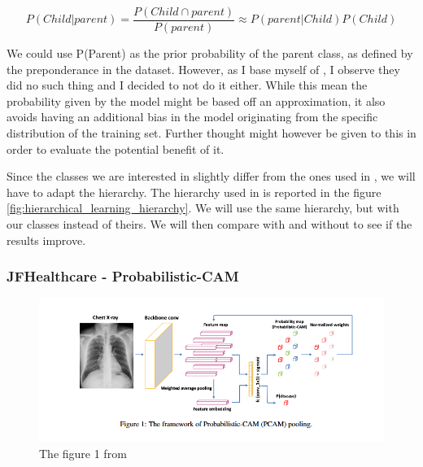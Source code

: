 \documentclass[11pt]{article}
\begin{document}
                    \begin{equation}
                        P(Child|parent) = \frac{P(Child \cap parent)}{P(parent)} \approx P(parent|Child) P(Child)
                    \end{equation}

                    We could use P(Parent) as the prior probability of the parent class, as defined by the preponderance in the dataset. However, as I base myself of
                    \cite{hierarchical}, I observe they did no such thing and I decided to not do it either. While this mean the probability given by the model might be based off an approximation,
                    it also avoids having an additional bias in the model originating from the specific distribution of the training set. Further thought might however be given to this in order to evaluate the potential benefit of it.

                    Since the classes we are interested in slightly differ from the ones used in \cite{hierarchical},
                    we will have to adapt the hierarchy. The hierarchy used in \cite{hierarchical} is reported in the figure \ref{fig:hierarchical_learning_hierarchy}. We will use the same hierarchy, but with our classes instead of theirs.
                    We will then compare with and without to see if the results improve.



            \subsubsection{JFHealthcare - Probabilistic-CAM \cite{jfhealthcare}}

            \begin{figure}[h!]

                 \centering
                 \includegraphics[width=0.8 \textwidth]{plots/jfhealthcare}
                 \caption{The figure 1 from \cite{jfhealthcare}}
                 \label{fig:jfhealthcare_probabilistic_cam}

            \end{figure}
\end{document}
